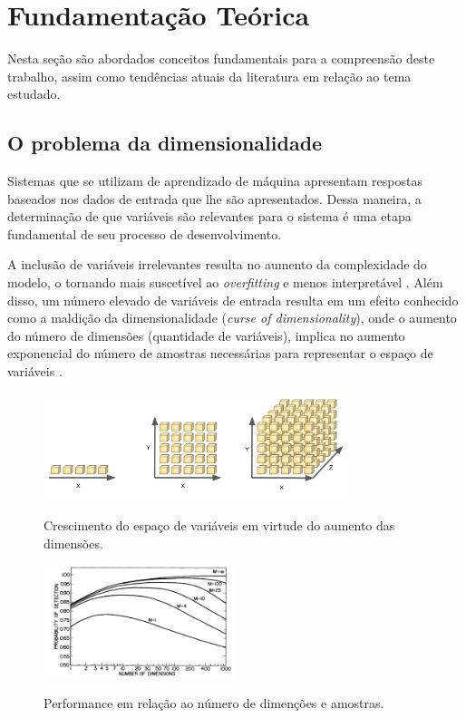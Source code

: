 \chapter[Fundamentação Teórica]{Fundamentação Teórica}

Nesta seção são abordados conceitos fundamentais para a compreensão deste trabalho, assim como tendências atuais da literatura em relação ao tema estudado.

\section{O problema da dimensionalidade}

Sistemas que se utilizam de aprendizado de máquina apresentam respostas baseados nos dados de entrada que lhe são apresentados. Dessa maneira, a determinação de que variáveis são relevantes para o sistema é uma etapa fundamental de seu processo de desenvolvimento.

A inclusão de variáveis irrelevantes resulta no aumento da complexidade do modelo, o tornando mais suscetível ao \textit{overfitting} e menos interpretável \cite[p. 204]{intro_stat_learn}. Além disso, um número elevado de variáveis de entrada resulta em um efeito conhecido como a maldição da dimensionalidade (\textit{curse of dimensionality}), onde o aumento do número de dimensões (quantidade de variáveis), implica no aumento exponencial do número de amostras necessárias para representar o espaço de variáveis \cite[p. 34]{bishop_2006}.

\begin{figure}[H]
    \centering
    \caption{Crescimento do espaço de variáveis em virtude do aumento das dimensões.}
    \includegraphics[width=0.8\textwidth]{imgs/rev/dimensionalty_grown.png}
    \label{fig:dim_grown}
\end{figure}

\begin{figure}[H]
    \centering
    \caption{Performance em relação ao número de dimenções e amostras.}
    \includegraphics[width=0.5\textwidth]{imgs/rev/dim_performance}
    \label{fig:dim_perf}
\end{figure}


